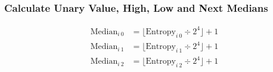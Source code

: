 \subsubsection{Calculate Unary Value, High, Low and Next Medians}
\begin{align*}
\text{Median}_{i~0} &= \lfloor\text{Entropy}_{i~0}\div2 ^ 4\rfloor + 1 \\
\text{Median}_{i~1} &= \lfloor\text{Entropy}_{i~1}\div2 ^ 4\rfloor + 1 \\
\text{Median}_{i~2} &= \lfloor\text{Entropy}_{i~2}\div2 ^ 4\rfloor + 1 \\
\end{align*}
